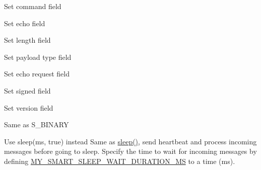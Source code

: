 \begin{DoxyRefList}
%
Set command field  
\item[Member \mbox{\hyperlink{group___my_messagegrp_gaac2ccefe892ec83088785062c9a78c3a}{m\+Set\+Echo}} (\+\_\+message, \+\_\+echo)]\label{deprecated__deprecated000012}%
%
Set echo field  
\item[Member \mbox{\hyperlink{group___my_messagegrp_ga12b37a50b2313786a799ff11df39bfae}{m\+Set\+Length}} (\+\_\+message, \+\_\+length)]\label{deprecated__deprecated000006}%
%
Set length field  
\item[Member \mbox{\hyperlink{group___my_messagegrp_ga0012f4aa103a61d8f64ed3670a33ba46}{m\+Set\+Payload\+Type}} (\+\_\+message, \+\_\+payload\+Type)]\label{deprecated__deprecated000014}%
%
Set payload type field  
\item[Member \mbox{\hyperlink{group___my_messagegrp_ga10ec1de4209986dd64bb2692d0ad5609}{m\+Set\+Request\+Echo}} (\+\_\+message, \+\_\+request\+Echo)]\label{deprecated__deprecated000010}%
%
Set echo request field  
\item[Member \mbox{\hyperlink{group___my_messagegrp_ga5bc9286420588ab5e203937404c60e51}{m\+Set\+Signed}} (\+\_\+message, \+\_\+signed)]\label{deprecated__deprecated000004}%
%
Set signed field  
\item[Member \mbox{\hyperlink{group___my_messagegrp_ga7ba63e69f9b3402f9074adc2f1df2611}{m\+Set\+Version}} (\+\_\+message, \+\_\+version)]\label{deprecated__deprecated000002}%
%
Set version field  
\item[Member \mbox{\hyperlink{group___my_messagegrp_gga401dba5ab91a0863e553b802a33066f4a64b3f7dbfdab152dc410895907aefaa6}{S\+\_\+\+L\+I\+G\+HT}} ]\label{deprecated__deprecated000016}%
%
Same as S\+\_\+\+B\+I\+N\+A\+RY  
\item[Member \mbox{\hyperlink{group___my_sensors_coregrp_ga4d3b9fffbce15b365a7b3547761a8874}{smart\+Sleep}} (const uint32\+\_\+t sleeping\+MS)]\label{deprecated__deprecated000020}%
%
Use sleep(ms, true) instead Same as \mbox{\hyperlink{group___my_sensors_coregrp_gab5f84c4227e3478af4b6600d5e8d8b15}{sleep()}}, send heartbeat and process incoming messages before going to sleep. Specify the time to wait for incoming messages by defining \mbox{\hyperlink{group___sleep_setting_grp_pub_gaf353bf3627ebd8f15e200b320e2e065d}{M\+Y\+\_\+\+S\+M\+A\+R\+T\+\_\+\+S\+L\+E\+E\+P\+\_\+\+W\+A\+I\+T\+\_\+\+D\+U\+R\+A\+T\+I\+O\+N\+\_\+\+MS}} to a time (ms).  

\end{DoxyRefList}
